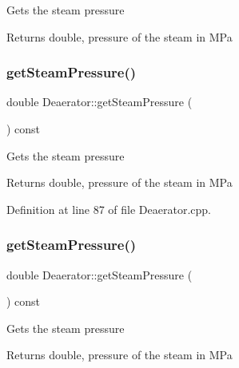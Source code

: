 Gets the steam pressure \begin{DoxyReturn}{Returns}
double, pressure of the steam in M\+Pa 
\end{DoxyReturn}
\mbox{\label{class_deaerator_aebe779c63cace193d040f497e3b70728}} 
\subsubsection{\texorpdfstring{get\+Steam\+Pressure()}{getSteamPressure()}\hspace{0.1cm}{\footnotesize\ttfamily [2/3]}}
{\footnotesize\ttfamily double Deaerator\+::get\+Steam\+Pressure (\begin{DoxyParamCaption}{ }\end{DoxyParamCaption}) const}

Gets the steam pressure \begin{DoxyReturn}{Returns}
double, pressure of the steam in M\+Pa 
\end{DoxyReturn}


Definition at line 87 of file Deaerator.\+cpp.

\mbox{\label{class_deaerator_aebe779c63cace193d040f497e3b70728}} 
\subsubsection{\texorpdfstring{get\+Steam\+Pressure()}{getSteamPressure()}\hspace{0.1cm}{\footnotesize\ttfamily [3/3]}}
{\footnotesize\ttfamily double Deaerator\+::get\+Steam\+Pressure (\begin{DoxyParamCaption}{ }\end{DoxyParamCaption}) const}

Gets the steam pressure \begin{DoxyReturn}{Returns}
double, pressure of the steam in M\+Pa 
\end{DoxyReturn}
\mbox{\label{class_deaerator_a18abbdc5ec78f71e1d2495b0c64c77ec}} 

